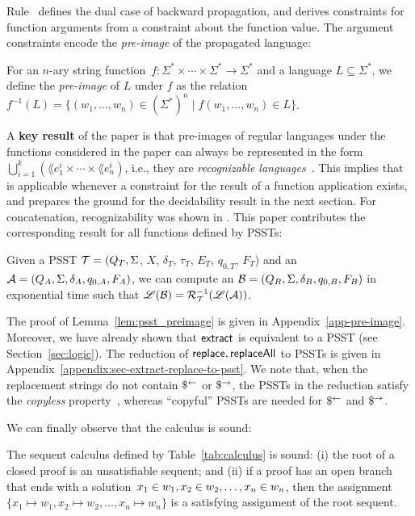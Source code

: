 Rule~ defines the dual case of backward
propagation, and derives \regexp{} constraints for function arguments
from a constraint about the function value. The argument constraints
encode the \emph{pre-image} of the propagated language:
%
\begin{definition}
  For an $n$-ary string
  function~$f : \Sigma^* \times \cdots \times \Sigma^* \to \Sigma^*$
  and a language $L \subseteq \Sigma^*$, we define the
  \emph{pre-image} of $L$ under $f$ as the relation
  $f^{-1}(L) = \{(w_1, \ldots, w_n) \in (\Sigma^*)^n \mid 
  f(w_1, \ldots, w_n) \in L\}$.
\end{definition}
A \textbf{key result} of the paper is that pre-images of regular
languages under the functions considered in the paper can always be
represented in the
form~$\bigcup_{i=1}^k ( \lang{e_1^i} \times \cdots \times \lang{e_n^i}
)$, i.e., they are \emph{recognizable languages}~\cite{CCG06}. This implies that
 is applicable whenever a \regexp{} constraint for the
result of a function application exists, and prepares the ground for
the decidability result in the next section.  For concatenation,
recognizability was shown in \cite{Abdulla14,CHL+19}. This paper
contributes the corresponding result for all functions defined by
PSSTs:
%
\begin{lemma}
  \label{lem:psst_preimage}
  Given a PSST $\mathcal{T} = (Q_T, \Sigma$, $X$, $\delta_T$, $\tau_T$, $E_T$,  $q_{0, T}$, $F_T$) and an \FA{} $\mathcal{A}
  = (Q_A, \Sigma, \delta_A, q_{0, A}, F_A)$, we can compute an \FA{} $\mathcal{B} = (Q_B,
  \Sigma, \delta_B, q_{0, B}, F_B)$ in exponential time  such that $\mathscr{L}(\mathcal{B}) = \mathcal{R}^{-1}_{\mathcal{T}}(\mathscr{L}(\mathcal{A}))$.
\end{lemma}
The proof of Lemma~\ref{lem:psst_preimage} is given in
Appendix~\ref{app-pre-image}. Moreover, we have already shown that $\mathsf{extract}$ is equivalent to a PSST (see Section~\ref{sec:logic}). The reduction of
$\mathsf{replace}, \mathsf{replaceAll}$ to PSSTs is given in
Appendix~\ref{appendix:sec-extract-replace-to-psst}. 
We note that, when the replacement strings do not contain $\$^{\leftarrow}$ or $\$^{\rightarrow}$, the PSSTs in the reduction satisfy the \emph{copyless} property~\cite{AC10}, whereas ``copyful'' PSSTs are needed for $\$^{\leftarrow}$ and $\$^{\rightarrow}$.

\medskip
%
We can finally observe that the calculus is sound:
\begin{lemma}[Soundness]
  The sequent calculus defined by Table~\ref{tab:calculus} is sound:
  (i) the root of a closed proof is an unsatisfiable sequent; and (ii)
  if a proof has an open branch that ends with a
  solution~$x_1 \in w_1, x_2 \in w_2, \ldots, x_n \in w_n$, then
  the
  assignment~$\{x_1 \mapsto w_1, x_2 \mapsto w_2, \ldots, x_n \mapsto
  w_n\}$ is a satisfying assignment of the root sequent.
\end{lemma}

